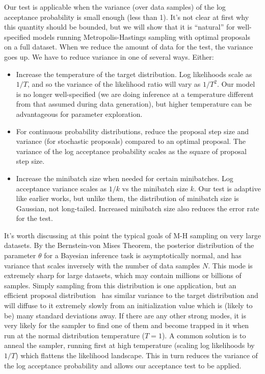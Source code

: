 \documentclass[twoside]{article} \usepackage{aistats2017}
\begin{document}
Our test is applicable when the variance (over data samples) of the log
acceptance probability is small enough (less than 1). It's not clear at first why
this quantity should be bounded, but we will show that it is ``natural'' for
well-specified models running Metropolis-Hastings sampling with optimal
proposals~\citep{OptimalScaling01} on a full dataset. When we reduce the amount
of data for the test, the variance goes up. We have to reduce variance in one
of several ways. Either:

\begin{itemize}
  
\item Increase the temperature of the target distribution. Log likelihoods
  scale as $1/T$, and so the variance of the likelihood ratio will
  vary as $1/T^2$. Our model is no longer well-specified (we are doing inference
  at a temperature different from that assumed during data generation), but
  higher temperature can be advantageous for parameter exploration.

\item For continuous probability distributions, reduce the proposal
  step size and variance (for stochastic proposals) compared to an optimal
  proposal. The variance of the log acceptance probability scales as the
  square of proposal step size. 

\item Increase the minibatch size when needed for certain
  minibatches. Log acceptance variance scales as $1/k$ vs the
  minibatch size $k$. Our test is adaptive like earlier works, but
  unlike them, the distribution of minibatch size is Gaussian, not
  long-tailed.  Increased minibatch size also reduces the error rate
  for the test.

\end{itemize}

It's worth discussing at this point the typical goals of
M-H sampling on very large datasets.  By the Bernstein-von Mises
Theorem, the posterior distribution of the parameter $\theta$ for a
Bayesian inference task is asymptotically normal, and has variance
that scales inversely with the number of data samples $N$. This mode
is extremely sharp for large datasets, which may contain millions or
billions of samples. Simply sampling from this distribution is one
application, but an efficient proposal distribution~\citep{OptimalScaling01} has similar variance to the target
distribution and will diffuse to it extremely slowly from an
initialization value which is (likely to be) many standard deviations
away. If there are any other strong modes, it is very likely for the
sampler to find one of them and become trapped in it when run at the
normal distribution temperature ($T=1$). A common solution is to anneal
the sampler, running first at high temperature (scaling log
likelihoods by $1/T$) which flattens the likelihood landscape.  This in
turn reduces the variance of the log acceptance probability and allows
our acceptance test to be applied.
\end{document}
